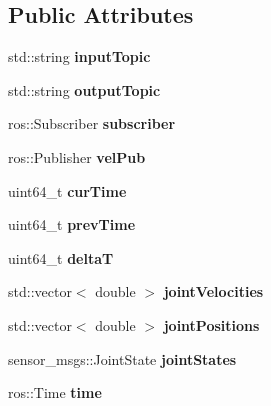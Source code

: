 \subsection*{Public Attributes}
\begin{DoxyCompactItemize}
\item 
std\+::string {\bfseries input\+Topic}\hypertarget{class_kinova_simulator_a3de17c15c8bd980f9660c418b6fda43e}{}\label{class_kinova_simulator_a3de17c15c8bd980f9660c418b6fda43e}

\item 
std\+::string {\bfseries output\+Topic}\hypertarget{class_kinova_simulator_ace934226a4d0cf29394738fbefa63482}{}\label{class_kinova_simulator_ace934226a4d0cf29394738fbefa63482}

\item 
ros\+::\+Subscriber {\bfseries subscriber}\hypertarget{class_kinova_simulator_a955f7009516d5c9e047055ca2a547650}{}\label{class_kinova_simulator_a955f7009516d5c9e047055ca2a547650}

\item 
ros\+::\+Publisher {\bfseries vel\+Pub}\hypertarget{class_kinova_simulator_a6253c4d485063d394918d9c39ace1cd4}{}\label{class_kinova_simulator_a6253c4d485063d394918d9c39ace1cd4}

\item 
uint64\+\_\+t {\bfseries cur\+Time}\hypertarget{class_kinova_simulator_abfec92f5d500ac733cadbdc51c094c1b}{}\label{class_kinova_simulator_abfec92f5d500ac733cadbdc51c094c1b}

\item 
uint64\+\_\+t {\bfseries prev\+Time}\hypertarget{class_kinova_simulator_aaa8372717d38c889c62db00b4e1d4836}{}\label{class_kinova_simulator_aaa8372717d38c889c62db00b4e1d4836}

\item 
uint64\+\_\+t {\bfseries deltaT}\hypertarget{class_kinova_simulator_ae81dc44297546fced66e20661fe91d29}{}\label{class_kinova_simulator_ae81dc44297546fced66e20661fe91d29}

\item 
std\+::vector$<$ double $>$ {\bfseries joint\+Velocities}\hypertarget{class_kinova_simulator_a38f4734d33ac32b3d0c813d2c73aa8b6}{}\label{class_kinova_simulator_a38f4734d33ac32b3d0c813d2c73aa8b6}

\item 
std\+::vector$<$ double $>$ {\bfseries joint\+Positions}\hypertarget{class_kinova_simulator_a049612d35ff258551c71c67201f8a718}{}\label{class_kinova_simulator_a049612d35ff258551c71c67201f8a718}

\item 
sensor\+\_\+msgs\+::\+Joint\+State {\bfseries joint\+States}\hypertarget{class_kinova_simulator_a44d2eba297d05e3b86347cdd44b31d6d}{}\label{class_kinova_simulator_a44d2eba297d05e3b86347cdd44b31d6d}

\item 
ros\+::\+Time {\bfseries time}\hypertarget{class_kinova_simulator_a2f49ec0229902c9229f18aeeea40c337}{}\label{class_kinova_simulator_a2f49ec0229902c9229f18aeeea40c337}

\end{DoxyCompactItemize}


